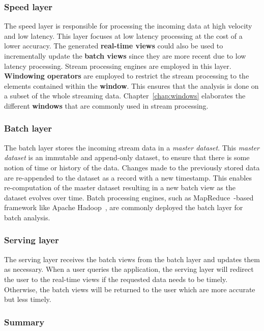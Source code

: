 \subsubsection{Speed layer}%
\label{sssec:Speed layer}
The speed layer is responsible for processing the incoming data at high velocity and low latency. 
This layer focuses at low latency processing at the cost of a lower accuracy. The generated 
\textbf{real-time views}  could also be used to incrementally update the \textbf{batch views} since they 
are more recent due to low latency processing. Stream processing engines are employed in this 
layer.  \textbf{Windowing operators} are employed 
to restrict the stream processing to the elements contained within the \textbf{window}. 
This ensures that the analysis is done on a subset of the whole streaming data. 
Chapter~\ref{chap:windows} elaborates the different \textbf{windows} that 
are commonly used in stream processing. 

\subsubsection{Batch layer}%
\label{sssec:Batch layer}
The batch layer stores the incoming stream data in a \emph{master dataset}. This \emph{master dataset} is an immutable
and append-only dataset, to ensure that there is some notion of time or history of the data. Changes made to 
the previously stored data are re-appended to the dataset as a record with a new timestamp.  
This enables re-computation of the master dataset resulting in a new batch view as the dataset evolves over time. 
Batch processing engines, such as MapReduce~\cite{mapreduce}-based framework like Apache Hadoop~\cite{hadoop}, 
are commonly deployed the batch layer for batch analysis. 


\subsubsection{Serving layer}%
\label{sssec:Serving layer}

The serving layer receives the batch views from the batch layer and updates them as necessary. When a user 
queries the application, the serving layer will redirect the user to the real-time views if the 
requested data needs to be timely. Otherwise, the batch views will be returned to the user which are 
more accurate but less timely.  


\subsubsection{Summary}%
\label{ssub:Summary}

